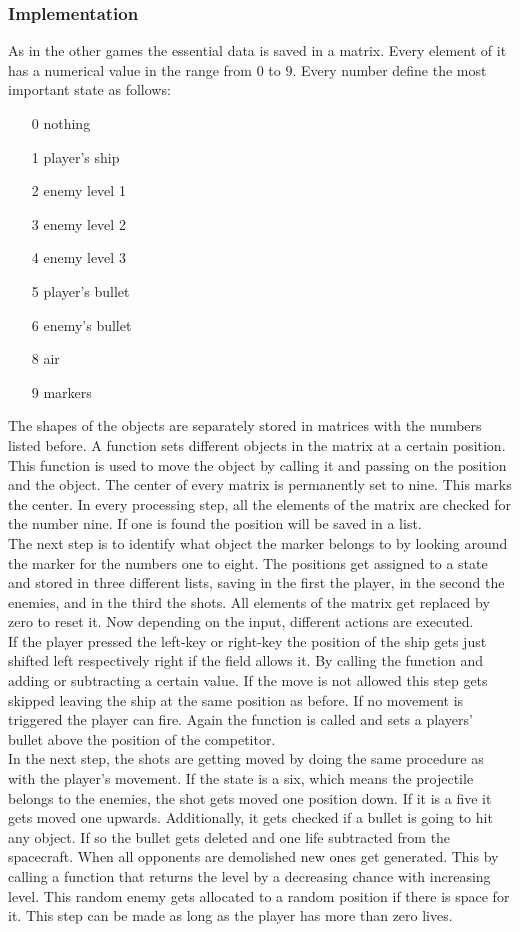 \documentclass[12pt]{article}
\begin{document}
\subsubsection{Implementation}
As in the other games the essential data is saved in a matrix. Every element of it has a numerical value in the range from $0$ to $9$. Every number define the most important \gls{state} as follows:
\begin{itemize}
\item[0] nothing
\item[1] player's ship
\item[2] enemy level 1
\item[3] enemy level 2
\item[4] enemy level 3
\item[5] player's bullet
\item[6] enemy's bullet
\item[8] air
\item[9] markers
\end{itemize}
The shapes of the objects are separately stored in matrices with the numbers listed before. A function sets different objects in the matrix at a certain position. This function is used to move the object by calling it and passing on the position and the object. The center of every matrix is permanently set to nine. This marks the center. In every processing step, all the elements of the matrix are checked for the number nine. If one is found the position will be saved in a list. \\
The next step is to identify what object the marker belongs to by looking around the marker for the numbers one to eight. The positions get assigned to a \gls{state} and stored in three different lists, saving in the first the player, in the second the enemies, and in the third the shots. All elements of the matrix get replaced by zero to reset it. Now depending on the  \gls{input}, different actions are executed. \\
If the player pressed the left-key or right-key the position of the ship gets just shifted left respectively right if the field allows it. By calling the function and adding or subtracting a certain value. If the move is not allowed this step gets skipped leaving the ship at the same position as before. If no movement is triggered the player can fire. Again the function is called and sets a players' bullet above the position of the competitor. \\
In the next step, the shots are getting moved by doing the same procedure as with the player's movement. If the \gls{state} is a six, which means the projectile belongs to the enemies, the shot gets moved one position down. If it is a five it gets moved one upwards. Additionally, it gets checked if a bullet is going to hit any object. If so the bullet gets deleted and one life subtracted from the spacecraft. When all opponents are demolished new ones get generated. This by calling a function that returns the level by a decreasing chance with increasing level. This random enemy gets allocated to a random position if there is space for it. This step can be made as long as the player has more than zero lives.   
\end{document}
